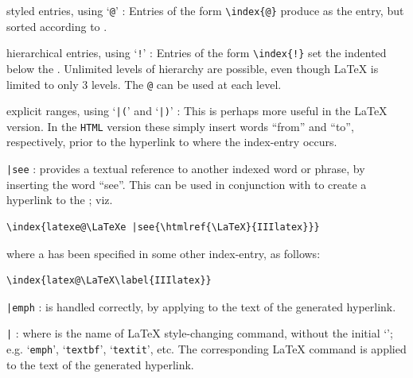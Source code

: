 \begin{htmllist}%
%
\item 
[styled entries, using `\texttt{@}' : ]
Entries of the form \verb|\index{|\verb|@|\verb|}|
produce  as the entry, but sorted according to .

%
\item 
[hierarchical entries, using `\texttt{!}' : ] 
Entries of the form
\verb|\index{|\verb|!|\verb|}|
set the  indented below the .
Unlimited levels of hierarchy are possible, 
even though \LaTeX{} is limited to only 3 levels. 
The \verb|@| can be used at each level.

%
\item 
[explicit ranges, using `\texttt{|(}' and `\texttt{|)}' : ]
This is perhaps more useful in the \LaTeX{} version. 
In the \texttt{HTML} version these simply insert words ``from'' and ``to'',
respectively, prior to the hyperlink to where the index-entry occurs.

%
%
\item 
[\texttt{|see\char123}\Meta{index-entry}\texttt{\char125} : ]
provides a textual reference to another indexed word or phrase, 
by inserting the word ``see''. 
This can be used in conjunction with  to create a hyperlink
to the ; viz.
\begin{verbatim}
\index{latexe@\LaTeXe |see{\htmlref{\LaTeX}{IIIlatex}}}
\end{verbatim}
where a  has been specified in some other index-entry, as follows:
\begin{verbatim}
\index{latex@\LaTeX\label{IIIlatex}}
\end{verbatim}

%
\item [\texttt{|emph} : ]
 is handled correctly, by applying
 to the text of the generated hyperlink.

%
\item [\texttt{|}\Meta{style} : ]
where  is the name of \LaTeX{} style-changing command, 
without the initial `\Lc{}'; e.g. `\texttt{emph}', `\texttt{textbf}',
`\texttt{textit}', etc. The corresponding \LaTeX{} command is applied
to the text of the generated hyperlink.


\end{htmllist}
